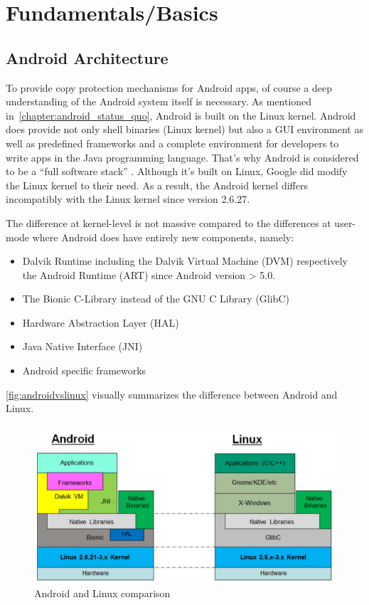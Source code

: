 \chapter{Fundamentals/Basics}\label{chapter:android_basics}

\section{Android Architecture}\label{section:android_architecture}
To provide copy protection mechanisms for Android apps,
of course a deep understanding of the Android system itself
is necessary. As mentioned in~\autoref{chapter:android_status_quo},
Android is built on the Linux kernel. Android does provide not
only shell binaries (Linux kernel) but also a GUI environment
as well as predefined frameworks and a complete environment
for developers to write apps in the Java programming language.
That's why Android is considered to be a ``full software stack''
\parencite[p.7f]{levin}. Although it's built on Linux,
Google did modify the Linux kernel to their need.
As a result, the Android kernel differs
incompatibly with the Linux kernel since version 2.6.27.

The difference at kernel-level is not massive compared to
the differences at user-mode where Android does have entirely new
components, namely:

\begin{itemize}
\item Dalvik Runtime including the Dalvik Virtual Machine (DVM)
respectively the Android Runtime (ART) since Android version > 5.0.
\item The Bionic C-Library instead of the GNU C Library (GlibC)
\item Hardware Abstraction Layer (HAL)
\item Java Native Interface (JNI)
\item Android specific frameworks
\end{itemize}

\autoref{fig:androidvslinux} visually summarizes the difference
between Android and Linux.

\begin{figure}[htb]
  \includegraphics[width=\textwidth]{figures/androidvslinux}
  \caption[Android vs Linux]{Android and Linux comparison
  ~\parencite[p.9]{levin}}
  \label{fig:androidvslinux}
\end{figure}

